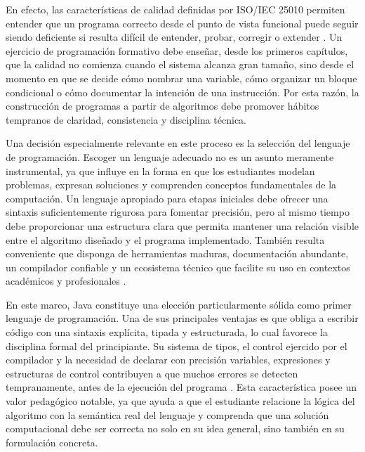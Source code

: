 \documentclass[12pt,twoside]{book}
\begin{document}
			En efecto, las características de calidad definidas por ISO/IEC 25010 permiten entender que un programa correcto desde el punto de vista funcional puede seguir siendo deficiente si resulta difícil de entender, probar, corregir o extender \cite{ISOIEC2024SystemsSoftwareEngineering,Mishra2004Review}. Un ejercicio de programación formativo debe enseñar, desde los primeros capítulos, que la calidad no comienza cuando el sistema alcanza gran tamaño, sino desde el momento en que se decide cómo nombrar una variable, cómo organizar un bloque condicional o cómo documentar la intención de una instrucción. Por esta razón, la construcción de programas a partir de algoritmos debe promover hábitos tempranos de claridad, consistencia y disciplina técnica.
			
			Una decisión especialmente relevante en este proceso es la selección del lenguaje de programación. Escoger un lenguaje adecuado no es un asunto meramente instrumental, ya que influye en la forma en que los estudiantes modelan problemas, expresan soluciones y comprenden conceptos fundamentales de la computación. Un lenguaje apropiado para etapas iniciales debe ofrecer una sintaxis suficientemente rigurosa para fomentar precisión, pero al mismo tiempo debe proporcionar una estructura clara que permita mantener una relación visible entre el algoritmo diseñado y el programa implementado. También resulta conveniente que disponga de herramientas maduras, documentación abundante, un compilador confiable y un ecosistema técnico que facilite su uso en contextos académicos y profesionales \cite{Sebesta2018Concepts,Deitel2025Java,Gosling2014JavaLanguageSpec}.
			
			En este marco, Java constituye una elección particularmente sólida como primer lenguaje de programación. Una de sus principales ventajas es que obliga a escribir código con una sintaxis explícita, tipada y estructurada, lo cual favorece la disciplina formal del principiante. Su sistema de tipos, el control ejercido por el compilador y la necesidad de declarar con precisión variables, expresiones y estructuras de control contribuyen a que muchos errores se detecten tempranamente, antes de la ejecución del programa \cite{Deitel2025Java,Gosling2014JavaLanguageSpec,Bloch2018EffectiveJava}. Esta característica posee un valor pedagógico notable, ya que ayuda a que el estudiante relacione la lógica del algoritmo con la semántica real del lenguaje y comprenda que una solución computacional debe ser correcta no solo en su idea general, sino también en su formulación concreta.
			
\end{document}
